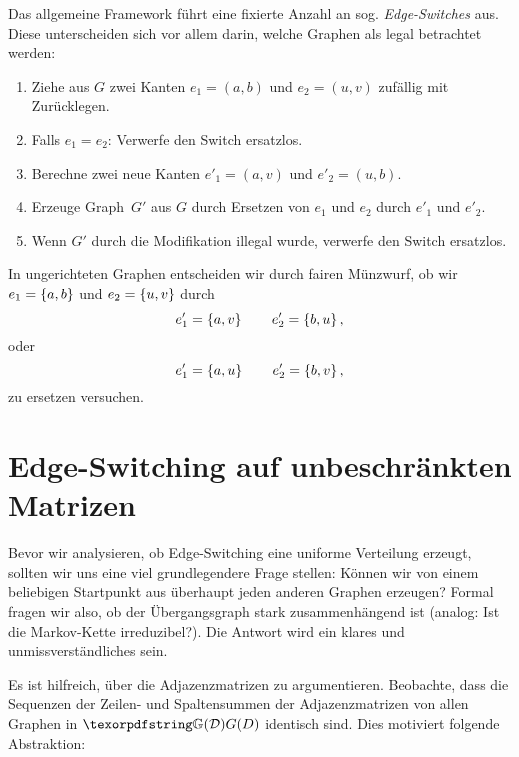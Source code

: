 Das  allgemeine Framework führt eine fixierte Anzahl an sog. \emph{Edge-Switches} aus.
Diese unterscheiden sich vor allem darin, welche Graphen als legal betrachtet werden:
\begin{enumerate}
    \item Ziehe aus $G$ zwei Kanten $e_1 = (a,b)$ und $e_2 = (u,v)$ zufällig mit Zurücklegen.
    \item Falls $e_1 = e_2$: Verwerfe den Switch ersatzlos.

    \item Berechne zwei neue Kanten $e'_1 = (a, v)$ und $e'_2 = (u, b)$.

    \item Erzeuge Graph~$G'$ aus $G$ durch Ersetzen von $e_1$ und $e_2$ durch $e'_1$ und $e'_2$.

    \item Wenn $G'$ durch die Modifikation illegal wurde, verwerfe den Switch ersatzlos.
\end{enumerate}

In  ungerichteten Graphen entscheiden wir durch fairen Münzwurf, ob wir $e_1 = \left\{a,b\right\}$ und $e_2 = \left\{u, v\right\}$ durch
\begin{equation}
    e'_1 = \left\{a, v\right\} \qquad e'_2 = \left\{b, u\right\},
\end{equation}
oder
\begin{equation}
    e'_1 = \left\{a, u\right\} \qquad e'_2 = \left\{b, v\right\},
\end{equation}
zu ersetzen versuchen.

\section{Edge-Switching auf unbeschränkten Matrizen}\label{sec:edge_switching_irreduzibel}
Bevor wir analysieren, ob Edge-Switching eine uniforme Verteilung erzeugt, sollten wir uns eine viel grundlegendere Frage stellen:
Können wir von einem beliebigen Startpunkt aus überhaupt jeden anderen Graphen erzeugen?
Formal fragen wir also, ob der Übergangsgraph stark zusammenhängend ist (analog: Ist die Markov-Kette irreduzibel?).
Die Antwort wird ein klares und unmissverständliches  sein.

\bigskip

Es ist hilfreich, über die Adjazenzmatrizen zu argumentieren.
Beobachte, dass die Sequenzen der Zeilen- und Spaltensummen der Adjazenzmatrizen von allen Graphen in $\gd$ identisch sind.
Dies motiviert folgende Abstraktion:


